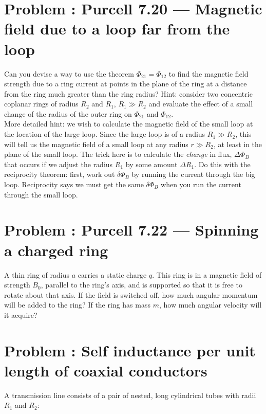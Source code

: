\documentclass[problems]{esg8022pset}
\begin{document}
\section{Problem \thesection: Purcell 7.20 --- Magnetic field due to a loop far from the loop}
Can you devise a way to use the theorem $\Phi_{21}=\Phi_{12}$ to find the magnetic
 field strength due to a ring current at points in the plane of the ring at a distance from the ring much greater than the ring radius?
 Hint: consider two concentric coplanar rings of radius $R_{2}$ and $R_{1}$, $R_{1}\gg R_{2}$ and evaluate the effect of a small change
  of the radius of the outer ring on $\Phi_{21}$ and $\Phi_{12}$. \\

\noindent  More detailed hint:  we wish to calculate
the magnetic field of the small loop at the location of the large
loop.  Since the large loop is of a radius $R_1 \gg R_2$, this will
tell us the magnetic field of a small loop at any radius $r \gg R_2$,
at least in the plane of the small loop. The trick here is to calculate the {\it change} in
flux, $\Delta\Phi_B$ that occurs if we adjust the radius $R_1$ by
some amount $\Delta R_1$.  Do this with the reciprocity theorem:
first, work out $\delta\Phi_B$ by running the current through the big
loop.  Reciprocity says we must get the same
$\delta\Phi_B$ when you run the current through the small loop.
\section{Problem \thesection: Purcell 7.22 --- Spinning a charged ring}
A thin ring of radius $a$ carries a static charge $q$. This ring is in a magnetic field of strength $B_0$, parallel to the ring's axis, and is supported so that it is free to rotate about that axis. If the field is switched off, how much angular momentum will be added to the ring? If the ring has mass $m$, how much angular velocity will it acquire?
\section{Problem \thesection: Self inductance per unit length of coaxial conductors }
A transmission line consists of a pair of nested, long cylindrical
tubes with radii $R_1$ and $R_2$:
\end{document}
